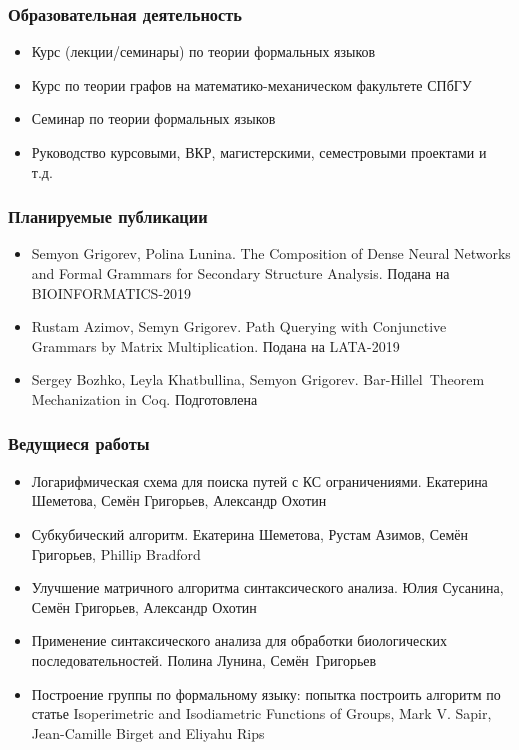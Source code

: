 \documentclass[xcolor=table]{beamer}
\begin{document}
\begin{frame}[fragile]
  \transwipe[direction=90]
  \frametitle{Образовательная деятельность}
\begin{itemize}
      \item Курс (лекции/семинары) по теории формальных языков 
      \item Курс по теории графов на математико-механическом факультете СПбГУ
      \item Семинар по теории формальных языков
      \item Руководство курсовыми, ВКР, магистерскими, семестровыми проектами и т.д.
\end{itemize}
\end{frame}

\begin{frame}[fragile]
  \transwipe[direction=90]
  \frametitle{Планируемые публикации}
\begin{itemize}
      \item Semyon Grigorev, Polina Lunina. The Composition of Dense Neural Networks and Formal Grammars for Secondary Structure Analysis. Подана на BIOINFORMATICS-2019
      \item Rustam Azimov, Semyn Grigorev. Path Querying with Conjunctive Grammars by Matrix Multiplication. Подана на LATA-2019
      \item Sergey Bozhko, Leyla Khatbullina, Semyon Grigorev. Bar-Hillel~Theorem Mechanization in Coq. Подготовлена
\end{itemize}
\end{frame}

\begin{frame}[fragile]
  \transwipe[direction=90]
  \frametitle{Ведущиеся работы}
\begin{itemize}
      \item Логарифмическая схема для поиска путей с КС ограничениями. Екатерина Шеметова, Семён Григорьев, Александр Охотин
      \item Субкубический алгоритм. Екатерина Шеметова, Рустам Азимов, Семён Григорьев, Phillip Bradford
      \item Улучшение матричного алгоритма синтаксического анализа. Юлия Сусанина, Семён Григорьев, Александр Охотин
      \item Применение синтаксического анализа для обработки биологических последовательностей. Полина Лунина, Семён~Григорьев
      \item Построение группы по формальному языку: попытка построить алгоритм по статье Isoperimetric and Isodiametric Functions of Groups, Mark V. Sapir, Jean-Camille Birget and Eliyahu Rips
\end{itemize}
\end{frame}
\end{document}

